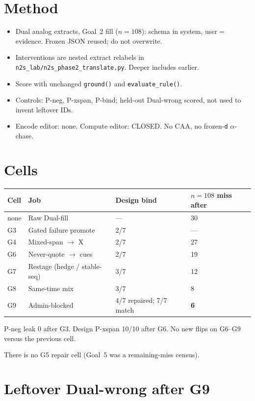 \documentclass[11pt,a4paper]{article}
\begin{document}
\section{Method}

\begin{itemize}
  \item Dual analog extracts, Goal~2 fill ($n=108$): schema in system, user$=$evidence. Frozen JSON reused; do not overwrite.
  \item Interventions are nested extract relabels in \texttt{n2s\_lab/n2s\_phase2\_translate.py}. Deeper includes earlier.
  \item Score with unchanged \texttt{ground()} and \texttt{evaluate\_rule()}.
  \item Controls: P-neg, P-xspan, P-bind; held-out Dual-wrong scored, not used to invent leftover IDs.
  \item Encode editor: none. Compute editor: CLOSED. No CAA, no frozen-\texttt{d} $\alpha$-chase.
\end{itemize}

\section{Cells}

{\small
\begin{tabular}{@{}p{2.2cm}p{5.2cm}p{3.4cm}p{2.6cm}@{}}
\toprule
Cell & Job & Design bind & $n{=}108$ miss after \\
\midrule
none & Raw Dual-fill & --- & 30 \\
G3 & Gated failure promote & 2/7 & --- \\
G4 & Mixed-span $\rightarrow$ X & 2/7 & 27 \\
G6 & Never-quote $\rightarrow$ cues & 2/7 & 19 \\
G7 & Restage (hedge / stable-seq) & 3/7 & 12 \\
G8 & Same-time mix & 3/7 & 8 \\
G9 & Admin-blocked & 4/7 repaired; 7/7 match & \textbf{6} \\
\bottomrule
\end{tabular}
}

P-neg leak 0 after G3. Design P-xspan 10/10 after G6. No new flips on G6--G9 versus the previous cell.

There is no G5 repair cell (Goal~5 was a remaining-miss census).

\section{Leftover Dual-wrong after G9}
\end{document}
